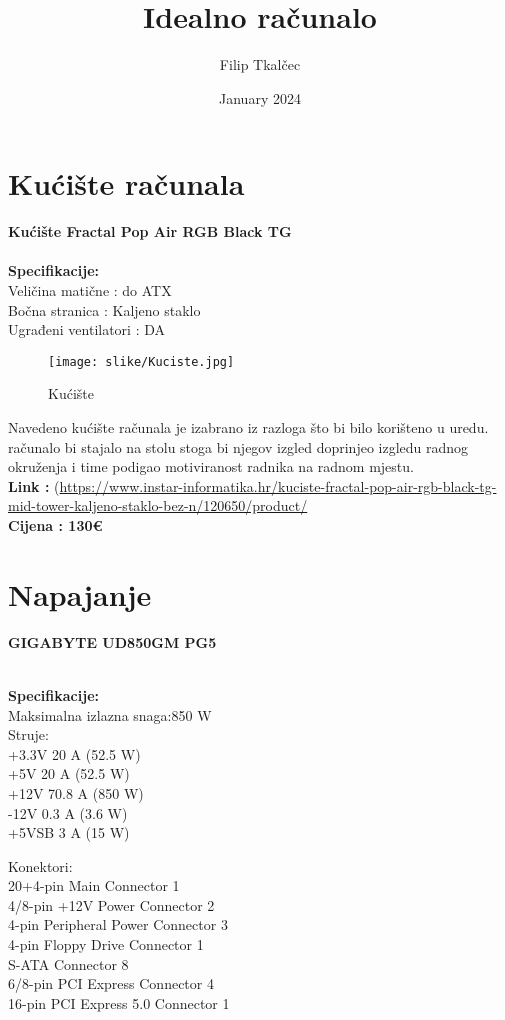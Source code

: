 \documentclass{article}
\title{Idealno računalo}
\author{Filip Tkalčec}
\date{January 2024}
\begin{document}
\maketitle

\section{Kućište računala}
\textbf{Kućište Fractal Pop Air RGB Black TG}
\\
\\ 
\textbf{Specifikacije:}
\\Veličina matične : do ATX
\\Bočna stranica : Kaljeno staklo
\\Ugrađeni ventilatori : DA


\begin{figure}[h]
    \centering
    \texttt{[image: slike/Kuciste.jpg]}
    \caption{Kućište}
    \label{fig:enter-label}
\end{figure}
Navedeno kućište računala je izabrano iz razloga što bi bilo korišteno u uredu. računalo bi stajalo na stolu stoga bi njegov izgled doprinjeo izgledu radnog okruženja i time podigao motiviranost radnika na radnom mjestu.
\\ \textbf{Link :} (\url{https://www.instar-informatika.hr/kuciste-fractal-pop-air-rgb-black-tg-mid-tower-kaljeno-staklo-bez-n/120650/product/} \
\\ \textbf{Cijena : 130€}
\newpage


\section{Napajanje}
\textbf{GIGABYTE UD850GM PG5}

\\
\newline
\textbf{Specifikacije:}
\\Maksimalna izlazna snaga:850 W
\\Struje:
\\+3.3V 20 A (52.5 W)
\\+5V 20 A (52.5 W)
\\+12V 70.8 A (850 W)
\\-12V 0.3 A (3.6 W)
\\+5VSB 3 A (15 W)

Konektori:
\\20+4-pin Main Connector 1
\\4/8-pin +12V Power Connector 2
\\4-pin Peripheral Power Connector 3
\\4-pin Floppy Drive Connector 1
\\S-ATA Connector 8
\\6/8-pin PCI Express Connector 4
\\16-pin PCI Express 5.0 Connector 1
\end{document}
